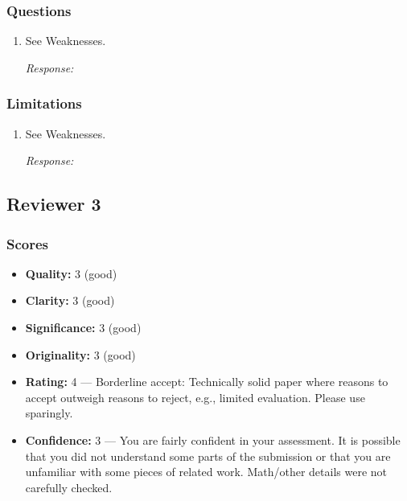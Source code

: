 \documentclass{article}
\newcommand{\score}[2]{\textbf{#1:} #2}
\newcommand{\response}[1][Response]{%
  \begin{answerbox}\textit{\small #1:}\end{answerbox}
}
\begin{document}
\subsubsection*{Questions}
\begin{enumerate}
    \item See Weaknesses.
    \response
\end{enumerate}

\subsubsection*{Limitations}
\begin{enumerate}
    \item See Weaknesses.
    \response
\end{enumerate}

\subsection{Reviewer 3}
\label{sec:r3}

\subsubsection*{Scores}
\begin{itemize}[nosep]
    \item \score{Quality}{3 (good)}
    \item \score{Clarity}{3 (good)}
    \item \score{Significance}{3 (good)}
    \item \score{Originality}{3 (good)}
    \item \score{Rating}{4 --- Borderline accept: Technically solid paper where reasons to accept outweigh reasons to reject, e.g., limited evaluation. Please use sparingly.}
    \item \score{Confidence}{3 --- You are fairly confident in your assessment. It is possible that you did not understand some parts of the submission or that you are unfamiliar with some pieces of related work. Math/other details were not carefully checked.}
\end{itemize}
\end{document}
